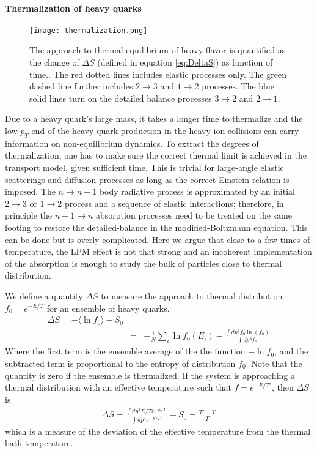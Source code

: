 \paragraph{Thermalization of heavy quarks}
\begin{figure}
\singlespacing
\centering
\texttt{[image: thermalization.png]}
\caption[The approach to thermal equilibrium of heavy flavor is quantified]{The approach to thermal equilibrium of heavy flavor is quantified as the change of $\Delta S$ (defined in equation \ref{eq:DeltaS}) as function of time.. The red dotted lines includes elastic processes only. The green dashed line further includes $2\rightarrow 3$ and $1\rightarrow 2$ processes. The blue solid lines turn on the detailed balance processes $3\rightarrow 2$ and $2\rightarrow 1$.}
\label{fig:thermalization}
\end{figure}
Due to a heavy quark's large mass, it takes a longer time to thermalize and the low-$p_T$ end of the heavy quark production in the heavy-ion collisions can carry information on non-equilibrium dynamics.
To extract the degrees of thermalization, one has to make sure the correct thermal limit is achieved in the transport model, given sufficient time.
This is trivial for large-angle elastic scatterings and diffusion processes as long as the correct Einstein relation is imposed.
The $n\rightarrow n+1$ body radiative process is approximated by an initial $2\rightarrow 3$ or $1\rightarrow 2$ process and a sequence of elastic interactions; therefore, in principle the $n+1\rightarrow n$ absorption processes need to be treated on the same footing to restore the detailed-balance in the modified-Boltzmann equation.
This can be done but is overly complicated.
Here we argue that close to a few times of temperature, the LPM effect is not that strong and an incoherent implementation of the absorption is enough to study the bulk of particles close to thermal distribution.

We define a quantity $\Delta S$ to measure the approach to thermal distribution $f_0 = e^{-E/T}$ for an ensemble of heavy quarks,
\begin{eqnarray}
\Delta S = - \langle \ln f_0 \rangle - S_0 \\
 &=& - \frac{1}{N}\sum_i\ln f_0(E_i) - \frac{\int dp^3 f_0 \ln(f_0)}{\int dp^3 f_0}
 \label{eq:DeltaS}
\end{eqnarray}
Where the first term is the ensemble average of the the function $-\ln f_0$, and the subtracted term is proportional to the entropy of distribution $f_0$.
Note that the quantity is zero if the ensemble is thermalized.
If the system is approaching a thermal distribution with an effective temperature such that $f = e^{-E/T'}$, then $\Delta S$ is 
\begin{eqnarray}
\Delta S = \frac{\int dp^3 E/T e^{-E/T'}}{\int dp^3 e^{-E/T'}} - S_0 = \frac{T'-T}{T}
\end{eqnarray}
which is a measure of the deviation of the effective temperature from the thermal bath temperature.

